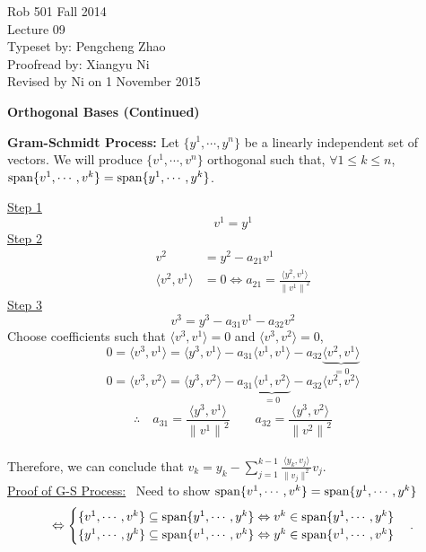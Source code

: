 \documentclass[letterpaper]{article}
\begin{document}
\baselineskip=48pt  %


\setlength{\parskip}{.3in}
\setlength{\itemsep}{.3in}

\pagestyle{plain}

{\Large \bf
\begin{center}
Rob 501 Fall 2014\\
Lecture 09\\
Typeset by:  Pengcheng Zhao\\
Proofread by: Xiangyu Ni\\
Revised by Ni on 1 November 2015
\end{center}
}



\Large

\begin{center}
\textbf{Orthogonal Bases (Continued)}
\end{center}

\noindent \textbf{Gram-Schmidt Process:} Let $\{y^1, \cdots , y^n\}$ be a linearly independent set of vectors. We will produce $\{v^1, \cdots , v^n\}$ orthogonal such that, $\forall 1 \leq k \leq n$, ${\rm span}\{v^1, \cdots, v^k\}={\rm span}\{y^1, \cdots, y^k\}$.

    \underline{Step 1}$$v^1 = y^1$$
    \underline{Step 2}
        \begin{align*}
            v^2&=y^2-a_{21}v^1\\
            \langle v^2,v^1 \rangle &=0 \Leftrightarrow a_{21}=\frac{ \langle y^2, v^1 \rangle }{{\|v^1\|}^2}
        \end{align*}
    \underline{Step 3}$$v^3=y^3 - a_{31}v^1 - a_{32}v^2$$
        Choose coefficients such that $ \langle v^3, v^1 \rangle =0$ and $ \langle v^3, v^2 \rangle =0$,
        $$0= \langle v^3,v^1 \rangle = \langle y^3, v^1 \rangle -a_{31} \langle v^1, v^1 \rangle -a_{32} \underbrace{\langle v^2, v^1 \rangle}_{=0} $$
        $$0= \langle v^3,v^2 \rangle = \langle y^3, v^2 \rangle -a_{31} \underbrace{\langle v^1, v^2 \rangle}_{=0} -a_{32} \langle v^2, v^2 \rangle $$
        $$\therefore \quad a_{31}=\frac{ \langle y^3, v^1 \rangle }{{\|v^1\|}^2} \qquad a_{32}=\frac{ \langle y^3, v^2 \rangle }{{\|v^2\|}^2}$$\\
    Therefore, we can conclude that $v_k=y_k-\sum_{j=1}^{k-1}\frac{\langle y_k, v_j\rangle}{\|v_j\|^2}v_j$.\\
    \underline{Proof of G-S Process:}~ Need to show $\textnormal{span}\{v^1, \cdots, v^k\}=\textnormal{span}\{y^1, \cdots, y^k\}$
    \begin{equation*}
        \Leftrightarrow
        \begin{cases}
            \{v^1, \cdots, v^k\}\subseteq\textnormal{span}\{y^1, \cdots, y^k\}\Leftrightarrow v^k\in\textnormal{span}\{y^1, \cdots, y^k\}\\
            \{y^1, \cdots, y^k\}\subseteq\textnormal{span}\{v^1, \cdots, v^k\}\Leftrightarrow y^k\in\textnormal{span}\{v^1, \cdots, v^k\}
        \end{cases}.
    \end{equation*}
\end{document}
